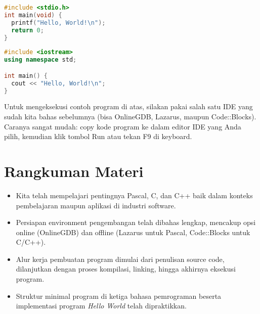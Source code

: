 \documentclass[../main.tex]{subfiles}
\begin{document}
\begin{lstlisting}[language=C, caption={Hello World pada C}]
#include <stdio.h>
int main(void) {
  printf("Hello, World!\n");
  return 0;
}
\end{lstlisting}

\begin{lstlisting}[language=C++, caption={Hello World pada C++}]
#include <iostream>
using namespace std;

int main() {
  cout << "Hello, World!\n";
}
\end{lstlisting}

Untuk mengeksekusi contoh program di atas, silakan pakai salah satu IDE yang sudah kita bahas sebelumnya (bisa OnlineGDB, Lazarus, maupun Code::Blocks). Caranya sangat mudah: copy kode program ke dalam editor IDE yang Anda pilih, kemudian klik tombol Run atau tekan F9 di keyboard.

\section{Rangkuman Materi}
\begin{itemize}
  \item Kita telah mempelajari pentingnya Pascal, C, dan C++ baik dalam konteks pembelajaran maupun aplikasi di industri software.
  \item Persiapan environment pengembangan telah dibahas lengkap, mencakup opsi online (OnlineGDB) dan offline (Lazarus untuk Pascal, Code::Blocks untuk C/C++).
  \item Alur kerja pembuatan program dimulai dari penulisan source code, dilanjutkan dengan proses kompilasi, linking, hingga akhirnya eksekusi program.
  \item Struktur minimal program di ketiga bahasa pemrograman beserta implementasi program \emph{Hello World} telah dipraktikkan.
\end{itemize}
\end{document}
